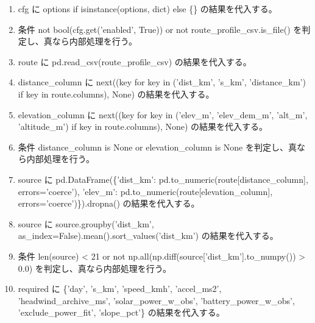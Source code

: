 \documentclass[a4paper,11pt]{article}
\begin{document}
            \begin{enumerate}[leftmargin=1.8em]
            \item cfg に options if isinstance(options, dict) else \{\} の結果を代入する。
\item 条件 not bool(cfg.get('enabled', True)) or not route\_profile\_csv.is\_file() を判定し、真なら内部処理を行う。
\item route に pd.read\_csv(route\_profile\_csv) の結果を代入する。
\item distance\_column に next((key for key in ('dist\_km', 's\_km', 'distance\_km') if key in route.columns), None) の結果を代入する。
\item elevation\_column に next((key for key in ('elev\_m', 'elev\_dem\_m', 'alt\_m', 'altitude\_m') if key in route.columns), None) の結果を代入する。
\item 条件 distance\_column is None or elevation\_column is None を判定し、真なら内部処理を行う。
\item source に pd.DataFrame(\{'dist\_km': pd.to\_numeric(route[distance\_column], errors='coerce'), 'elev\_m': pd.to\_numeric(route[elevation\_column], errors='coerce')\}).dropna() の結果を代入する。
\item source に source.groupby('dist\_km', as\_index=False).mean().sort\_values('dist\_km') の結果を代入する。
\item 条件 len(source) < 21 or not np.all(np.diff(source['dist\_km'].to\_numpy()) > 0.0) を判定し、真なら内部処理を行う。
\item required に \{'day', 's\_km', 'speed\_kmh', 'accel\_ms2', 'headwind\_archive\_ms', 'solar\_power\_w\_obs', 'battery\_power\_w\_obs', 'exclude\_power\_fit', 'slope\_pct'\} の結果を代入する。
            \end{enumerate}
\end{document}
